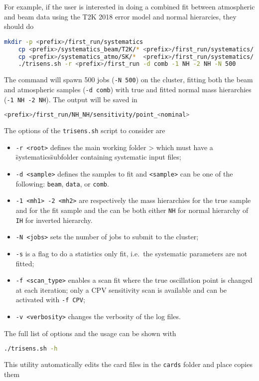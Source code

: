 \documentclass[a4paper, 11pt]{article}
\begin{document}
For example, if the user is interested in doing a combined fit between atmospheric and beam data %
using the T2K 2018 error model and normal hierarcies, they should do
\begin{lstlisting}[language=bash]
	mkdir -p <prefix>/first_run/systematics
	cp <prefix>/systematics_beam/T2K/* <prefix>/first_run/systematics/
	cp <prefix>/systematics_atmo/SK/*  <prefix>/first_run/systematics/
	./trisens.sh -r <prefix>/first_run -d comb -1 NH -2 NH -N 500
\end{lstlisting}
The command will spawn 500 jobs (\texttt{-N 500}) on the cluster, %
fitting both the beam and atmospheric samples %
(\texttt{-d comb}) with true and fitted normal mass hierarchies (\texttt{-1 NH -2 NH}).
The output will be saved in
\begin{lstlisting}[language=bash]
	<prefix>/first_run/NH_NH/sensitivity/point_<nominal>
\end{lstlisting}
The options of the \texttt{trisens.sh} script to consider are
\begin{itemize}
	\small
	\item \texttt{-r <root>} defines the main working folder > which must have a \"systematics\"
		subfolder containing systematic input files;
	\item \texttt{-d <sample>} defines the samples to fit and \texttt{<sample>} can be one of
		the following: \texttt{beam}, \texttt{data}, or \texttt{comb}.
	\item \texttt{-1 <mh1> -2 <mh2>} are respectively the mass hierarchies for the %
		true sample and for the fit sample and the can be both either \texttt{NH} %
		for normal hierarchy of \texttt{IH} for inverted hierarchy.
	\item \texttt{-N <jobs>} sets the number of jobs to submit to the cluster;
	\item \texttt{-s} is a flag to do a statistics only fit, i.e.\ the systematic parameters are not fitted;
	\item \texttt{-f <scan\_type>} enables a scan fit where the true oscillation point %
		is changed at each iteration; only a CPV sensitivity scan is available and %
		can be activated with \texttt{-f CPV};
	\item \texttt{-v <verbosity>} changes the verbosity of the log files.
\end{itemize}
The full list of options and the usage can be shown with
\begin{lstlisting}[language=bash]
	./trisens.sh -h
\end{lstlisting}
This utility automatically edits the card files in the \texttt{cards} folder and place copies them %
\end{document}
